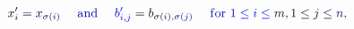 \documentclass[12pt]{article}
\begin{document}
\makeatletter
\renewcommand*{\@textcolor}[3]{%
  \protect\leavevmode
  \begingroup
    \color#1{#2}#3%
  \endgroup
}
\makeatother
\begin{displaymath}
\mathcolor[RGB]{0,0,15}{x} _ { \mathcolor[RGB]{0,0,30}{i} } ^ { \mathcolor[RGB]{0,0,45}{\prime} } \mathcolor[RGB]{0,0,60}{=} \mathcolor[RGB]{0,0,75}{x} _ { \mathcolor[RGB]{0,0,90}{\sigma} \mathcolor[RGB]{0,0,105}{(} \mathcolor[RGB]{0,0,120}{i} \mathcolor[RGB]{0,0,135}{)} } \quad \mathrm { ~ \mathcolor[RGB]{0,0,150}{a} \mathcolor[RGB]{0,0,165}{n} \mathcolor[RGB]{0,0,180}{d} ~ } \quad \mathcolor[RGB]{0,0,195}{b} _ { \mathcolor[RGB]{0,0,210}{i} \mathcolor[RGB]{0,0,225}{,} \mathcolor[RGB]{0,0,240}{j} } ^ { \mathcolor[RGB]{0,0,255}{\prime} } \mathcolor[RGB]{0,15,0}{=} \mathcolor[RGB]{0,15,15}{b} _ { \mathcolor[RGB]{0,15,30}{\sigma} \mathcolor[RGB]{0,15,45}{(} \mathcolor[RGB]{0,15,60}{i} \mathcolor[RGB]{0,15,75}{)} \mathcolor[RGB]{0,15,90}{,} \mathcolor[RGB]{0,15,105}{\sigma} \mathcolor[RGB]{0,15,120}{(} \mathcolor[RGB]{0,15,135}{j} \mathcolor[RGB]{0,15,150}{)} } \quad \mathrm { ~ \mathcolor[RGB]{0,15,165}{f} \mathcolor[RGB]{0,15,180}{o} \mathcolor[RGB]{0,15,195}{r} ~ } \mathcolor[RGB]{0,15,210}{1} \mathcolor[RGB]{0,15,225}{\leq} \mathcolor[RGB]{0,15,240}{i} \mathcolor[RGB]{0,15,255}{\leq} \mathcolor[RGB]{0,30,0}{m} \mathcolor[RGB]{0,30,15}{,} \mathcolor[RGB]{0,30,30}{1} \mathcolor[RGB]{0,30,45}{\leq} \mathcolor[RGB]{0,30,60}{j} \mathcolor[RGB]{0,30,75}{\leq} \mathcolor[RGB]{0,30,90}{n} \mathcolor[RGB]{0,30,105}{,}
\end{displaymath}
\end{document}
